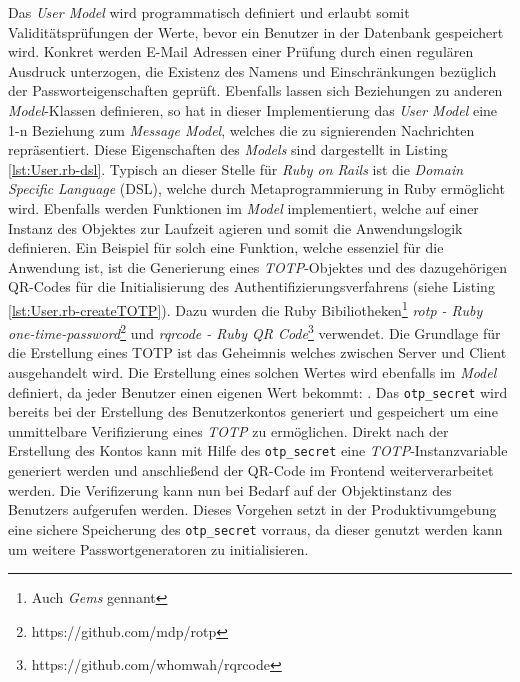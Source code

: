 \documentclass[11pt,a4paper,ngerman]{scrreprt}
\begin{document}
Das \textit{User Model} wird programmatisch definiert und erlaubt somit Validitätsprüfungen der Werte, bevor ein Benutzer in der Datenbank gespeichert wird. Konkret werden E-Mail Adressen einer Prüfung durch einen regulären Ausdruck unterzogen, die Existenz des Namens und Einschränkungen bezüglich der Passworteigenschaften geprüft. Ebenfalls lassen sich Beziehungen zu anderen \textit{Model}-Klassen definieren, so hat in dieser Implementierung das \textit{User Model} eine 1-n Beziehung zum \textit{Message Model}, welches die zu signierenden Nachrichten repräsentiert. Diese Eigenschaften des \textit{Models} sind dargestellt in Listing \ref{lst:User.rb-dsl}. Typisch an dieser Stelle für \textit{Ruby on Rails} ist die \textit{Domain Specific Language} (DSL), welche durch Metaprogrammierung in Ruby ermöglicht wird. Ebenfalls werden Funktionen im \textit{Model} implementiert, welche auf einer Instanz des Objektes zur Laufzeit agieren und somit die Anwendungslogik definieren. Ein Beispiel für solch eine Funktion, welche essenziel für die Anwendung ist, ist die Generierung eines \textit{TOTP}-Objektes und des dazugehörigen QR-Codes für die Initialisierung des Authentifizierungsverfahrens (siehe Listing \ref{lst:User.rb-createTOTP}). Dazu wurden die Ruby Bibiliotheken\footnote{Auch \textit{Gems} gennant} \textit{rotp - Ruby one-time-password}\footnote{https://github.com/mdp/rotp} und \textit{rqrcode - Ruby QR Code}\footnote{https://github.com/whomwah/rqrcode} verwendet. Die Grundlage für die Erstellung eines TOTP ist das Geheimnis welches zwischen Server und Client ausgehandelt wird. Die Erstellung eines solchen Wertes wird ebenfalls im \textit{Model} definiert, da jeder Benutzer einen eigenen Wert bekommt:  . Das \texttt{otp\_secret} wird bereits bei der Erstellung des Benutzerkontos generiert und gespeichert um eine unmittelbare Verifizierung eines \textit{TOTP} zu ermöglichen. Direkt nach der Erstellung des Kontos kann mit Hilfe des \texttt{otp\_secret} eine \textit{TOTP}-Instanzvariable generiert werden und anschließend der QR-Code im Frontend weiterverarbeitet werden. Die Verifizerung kann nun bei Bedarf auf der Objektinstanz des Benutzers aufgerufen werden. Dieses Vorgehen setzt in der Produktivumgebung eine sichere Speicherung des \texttt{otp\_secret} vorraus, da dieser genutzt werden kann um weitere Passwortgeneratoren zu initialisieren.
\end{document}
